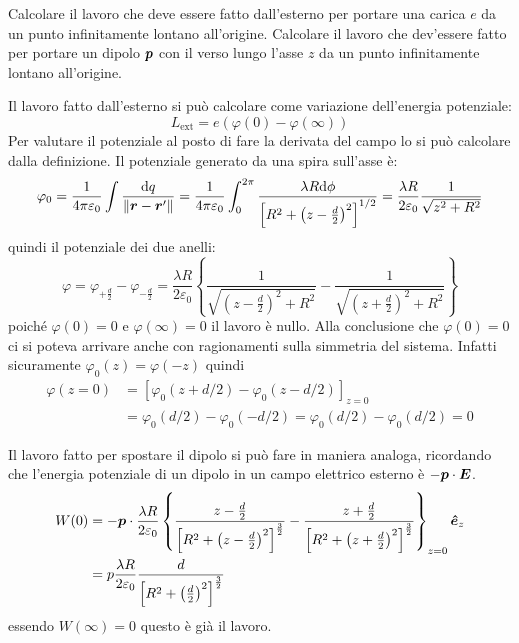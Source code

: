 \begin{Es}
  Calcolare il lavoro che deve essere fatto dall'esterno per portare una carica $e$ da un punto infinitamente lontano all'origine. Calcolare il lavoro che dev'essere fatto per portare un dipolo $\boldsymbol{p}$ con il verso lungo l'asse $z$ da un punto infinitamente lontano all'origine.

  Il lavoro fatto dall'esterno si può calcolare come variazione dell'energia potenziale:
  \[
    L_\text{ext} = e(\varphi(0)-\varphi(\infty))
  \]
  Per valutare il potenziale al posto di fare la derivata del campo lo si può calcolare dalla definizione. Il potenziale generato da una spira sull'asse è:
  \[
    \varphi_0 = \frac{1}{4\pi\varepsilon_0}\int\frac{\mathrm{d} q}{\left\lVert\boldsymbol{r} - \boldsymbol{r}'\right\rVert} = \frac{1}{4\pi\varepsilon_0}\int_0^{2\pi}\frac{\lambda R\mathrm{d}\phi}{\left[R^2+\left(z-\frac{d}{2}\right)^2\right]^{1/2}}=\frac{\lambda R}{2\varepsilon_0}\frac{1}{\sqrt{z^2+R^2}}
  \]
  quindi il potenziale dei due anelli:
  \[
    \varphi = \varphi_{+\frac{d}{2}} - \varphi_{-\frac{d}{2}} = \frac{\lambda R}{2\varepsilon_0}\left\{\frac{1}{\sqrt{\left(z-\frac{d}{2}\right)^2+R^2}}-\frac{1}{\sqrt{\left(z+\frac{d}{2}\right)^2+R^2}}\right\}
  \]
  poiché $\varphi(0)=0$ e $\varphi(\infty)=0$ il lavoro è nullo. Alla conclusione che $\varphi(0)=0$ ci si poteva arrivare anche con ragionamenti sulla simmetria del sistema. Infatti sicuramente $\varphi_0(z) = \varphi(-z)$ quindi
  \[
    \begin{aligned}
      \varphi(z=0) & = \left[\varphi_0(z+d/2)-\varphi_0(z-d/2)\right]_{z=0}               \\
                   & = \varphi_0(d/2)-\varphi_0(-d/2) = \varphi_0(d/2)-\varphi_0(d/2) = 0
    \end{aligned}
  \]


  Il lavoro fatto per spostare il dipolo si può fare in maniera analoga, ricordando che l'energia potenziale di un dipolo in un campo elettrico esterno è $-\boldsymbol{p}\cdot \boldsymbol{E}$.
  \begin{align*}
    W(0) & = -\boldsymbol{p}\cdot \frac{\lambda R}{2\varepsilon_0}\left\{
    \frac{z-\frac{d}{2}}{\left[R^2+\left(z-\frac{d}{2}\right)^2\right]^{\frac{3}{2}}}
    -\frac{z+\frac{d}{2}}{\left[R^2+\left(z+\frac{d}{2}\right)^2\right]^{\frac{3}{2}}}\right\}_{z=0}\boldsymbol{\hat {e}}_z \\
         & = p\frac{\lambda R}{2\varepsilon_0}
    \frac{d}{\left[R^2+\left(\frac{d}{2}\right)^2\right]^{\frac{3}{2}}}
  \end{align*}
  essendo $W(\infty)=0$ questo è già il lavoro.
\end{Es}



